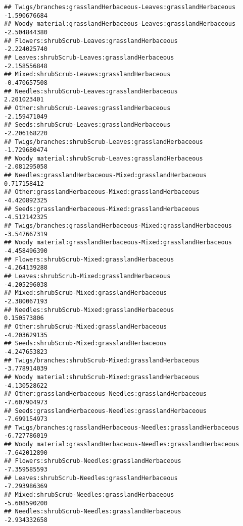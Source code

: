 \documentclass[
]{article}
\begin{document}
\begin{verbatim}
## Twigs/branches:grasslandHerbaceous-Leaves:grasslandHerbaceous         -1.590676684
## Woody material:grasslandHerbaceous-Leaves:grasslandHerbaceous         -2.504844380
## Flowers:shrubScrub-Leaves:grasslandHerbaceous                         -2.224025740
## Leaves:shrubScrub-Leaves:grasslandHerbaceous                          -2.158556848
## Mixed:shrubScrub-Leaves:grasslandHerbaceous                           -0.470657508
## Needles:shrubScrub-Leaves:grasslandHerbaceous                          2.201023401
## Other:shrubScrub-Leaves:grasslandHerbaceous                           -2.159471049
## Seeds:shrubScrub-Leaves:grasslandHerbaceous                           -2.206168220
## Twigs/branches:shrubScrub-Leaves:grasslandHerbaceous                  -1.729680474
## Woody material:shrubScrub-Leaves:grasslandHerbaceous                  -2.081295058
## Needles:grasslandHerbaceous-Mixed:grasslandHerbaceous                  0.717158412
## Other:grasslandHerbaceous-Mixed:grasslandHerbaceous                   -4.420892325
## Seeds:grasslandHerbaceous-Mixed:grasslandHerbaceous                   -4.512142325
## Twigs/branches:grasslandHerbaceous-Mixed:grasslandHerbaceous          -3.547667319
## Woody material:grasslandHerbaceous-Mixed:grasslandHerbaceous          -4.458496390
## Flowers:shrubScrub-Mixed:grasslandHerbaceous                          -4.264139288
## Leaves:shrubScrub-Mixed:grasslandHerbaceous                           -4.205296038
## Mixed:shrubScrub-Mixed:grasslandHerbaceous                            -2.380067193
## Needles:shrubScrub-Mixed:grasslandHerbaceous                           0.150573806
## Other:shrubScrub-Mixed:grasslandHerbaceous                            -4.203629135
## Seeds:shrubScrub-Mixed:grasslandHerbaceous                            -4.247653823
## Twigs/branches:shrubScrub-Mixed:grasslandHerbaceous                   -3.778914039
## Woody material:shrubScrub-Mixed:grasslandHerbaceous                   -4.130528622
## Other:grasslandHerbaceous-Needles:grasslandHerbaceous                 -7.607904973
## Seeds:grasslandHerbaceous-Needles:grasslandHerbaceous                 -7.699154973
## Twigs/branches:grasslandHerbaceous-Needles:grasslandHerbaceous        -6.727786019
## Woody material:grasslandHerbaceous-Needles:grasslandHerbaceous        -7.642012890
## Flowers:shrubScrub-Needles:grasslandHerbaceous                        -7.359585593
## Leaves:shrubScrub-Needles:grasslandHerbaceous                         -7.293986369
## Mixed:shrubScrub-Needles:grasslandHerbaceous                          -5.608590200
## Needles:shrubScrub-Needles:grasslandHerbaceous                        -2.934332658

\end{verbatim}
\end{document}
